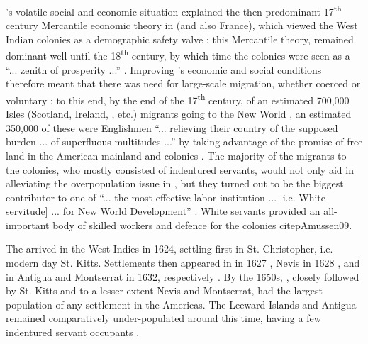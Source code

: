 's volatile social and economic situation explained the then predominant 17\textsuperscript{th} century Mercantile economic theory in  (and also France), which viewed the West Indian colonies as a demographic safety valve \citep{Johnson22, Ayearst60, Games08}; this Mercantile theory, remained dominant well until the 18\textsuperscript{th} century, by which time the  colonies were seen as a ``... zenith of prosperity ...'' \citep[48]{MacMillan70}. Improving 's economic and social conditions therefore meant that there was need for large-scale migration, whether coerced or voluntary \citep{Amussen09}; to this end, by the end of the 17\textsuperscript{th} century, of an estimated 700,000  Isles (Scotland, Ireland, , etc.) migrants going to the New World \citep[54]{Games08}, an estimated 350,000 of these were Englishmen ``... relieving their country of the supposed burden ... of superfluous multitudes ...'' by taking advantage of the promise of free land in the American mainland and  colonies \citep[402]{Zahedieh01}. The majority of the  migrants to the colonies, who mostly consisted of indentured servants, would not only aid in alleviating the overpopulation issue in , but they turned out to be the biggest contributor to one of ``... the most effective labor institution ... [i.e. White servitude] ... for  New World Development'' \citep[36]{Beckles89}. White servants provided an all-important body of skilled workers and defence for the  colonies citep{Amussen09}.

The  arrived in the West Indies in 1624, settling first in St. Christopher, i.e. modern day St. Kitts. Settlements then appeared in  in 1627 \citep{Dunn73}, Nevis in 1628 \citep{Wroughton06}, and in Antigua and Montserrat in 1632, respectively \citep{Forsyth69}. By the 1650s, , closely followed by St. Kitts and to a lesser extent Nevis and Montserrat, had the largest population of any settlement in the  Americas. The Leeward Islands and Antigua remained comparatively under-populated around this time, having a few  indentured servant occupants \citep{Davis87, Galenson02}.


